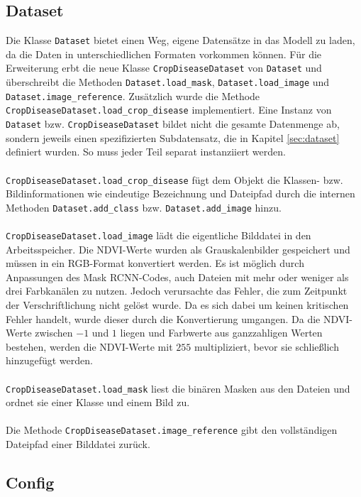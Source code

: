 \subsection{Dataset}\label{sub:sec:dataset}

Die Klasse \texttt{Dataset} bietet einen Weg, eigene Datensätze in das Modell zu laden, da die Daten in unterschiedlichen Formaten vorkommen können. Für die Erweiterung erbt die neue Klasse \texttt{CropDiseaseDataset} von \texttt{Dataset} und überschreibt die Methoden \texttt{Dataset.load\_mask}, \texttt{Dataset.load\_image} und \texttt{Dataset.image\_reference}. Zusätzlich wurde die Methode \texttt{CropDiseaseDataset.load\_crop\_disease} implementiert. Eine Instanz von \texttt{Dataset} bzw. \texttt{CropDiseaseDataset} bildet nicht die gesamte Datenmenge ab, sondern jeweils einen spezifizierten Subdatensatz, die in Kapitel \ref{sec:dataset} definiert wurden. So muss jeder Teil separat instanziiert werden. 
\\\\
\texttt{CropDiseaseDataset.load\_crop\_disease} fügt dem Objekt die Klassen- bzw. Bildinformationen wie eindeutige Bezeichnung und Dateipfad durch die internen Methoden \texttt{Dataset.add\_class} bzw. \texttt{Dataset.add\_image} hinzu. 
\\\\
\texttt{CropDiseaseDataset.load\_image} lädt die eigentliche Bilddatei in den Arbeitsspeicher. Die NDVI-Werte wurden als Grauskalenbilder gespeichert und müssen in ein RGB-Format konvertiert werden. Es ist möglich durch Anpassungen des Mask RCNN-Codes, auch Dateien mit mehr oder weniger als drei Farbkanälen zu nutzen. Jedoch verursachte das Fehler, die zum Zeitpunkt der Verschriftlichung nicht gelöst wurde. Da es sich dabei um keinen kritischen Fehler handelt, wurde dieser durch die Konvertierung umgangen. Da die NDVI-Werte zwischen $-1$ und $1$ liegen und Farbwerte aus ganzzahligen Werten bestehen, werden die NDVI-Werte mit $255$ multipliziert, bevor sie schließlich hinzugefügt werden.
\\\\
\texttt{CropDiseaseDataset.load\_mask} liest die binären Masken aus den Dateien und ordnet sie einer Klasse und einem Bild zu. 
\\\\
Die Methode \texttt{CropDiseaseDataset.image\_reference} gibt den vollständigen Dateipfad einer Bilddatei zurück.

\subsection{Config}

